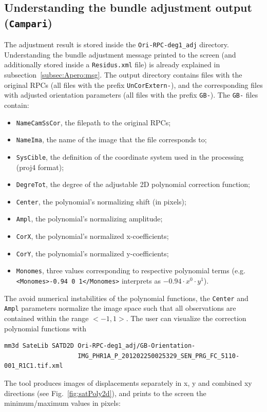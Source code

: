 \subsection{Understanding the bundle adjustment output ({\tt Campari})} 
%
The adjustment result is stored inside the {\texttt{Ori-RPC-deg1\_adj}} directory. Understanding the bundle adjustment message printed to the screen (and additionally stored inside a {\tt Residus.xml} file) is already explained in subsection~\ref{subsec:Apero:msg}. The output directory contains files with the original RPCs (all files with the prefix {\tt UnCorExtern-}), and the corresponding files with adjusted orientation parameters (all files with the prefix {\tt GB-}). The {\tt GB-} files contain:
\begin{itemize}
\item {\tt NameCamSsCor}, the filepath to the original RPCs;
\item {\tt NameIma}, the name of the image that the file corresponds to;
\item {\tt SysCible}, the definition of the coordinate system used in the processing (proj4 format);
\item {\tt DegreTot}, the degree of the adjustable 2D polynomial correction function;
\item {\tt Center}, the polynomial's normalizing shift (in pixels);
\item {\tt Ampl}, the polynomial's normalizing amplitude;
\item {\tt CorX}, the polynomial's normalized x-coefficients;
\item {\tt CorY}, the polynomial's normalized y-coefficients;
\item {\tt Monomes}, three values corresponding to respective polynomial terms (e.g. \texttt{<Monomes>-0.94 0 1</Monomes>} interprets as $-0.94 \cdot x^0 \cdot y^1 $). 
\end{itemize}
The avoid numerical instabilities of the polynomial functions, the {\tt Center} and {\tt Ampl} parameters normalize the image space such that all observations are contained within the range $<-1,1>$. The user can visualize the correction polynomial functions with 
\begin{verbatim}
mm3d SateLib SATD2D Ori-RPC-deg1_adj/GB-Orientation-
                    IMG_PHR1A_P_201202250025329_SEN_PRG_FC_5110-001_R1C1.tif.xml
\end{verbatim}
%
The tool produces images of displacements separately in x, y and combined xy directions (see Fig.~\ref{fig:satPoly2d}), and prints to the screen the minimum/maximum values in pixels:
